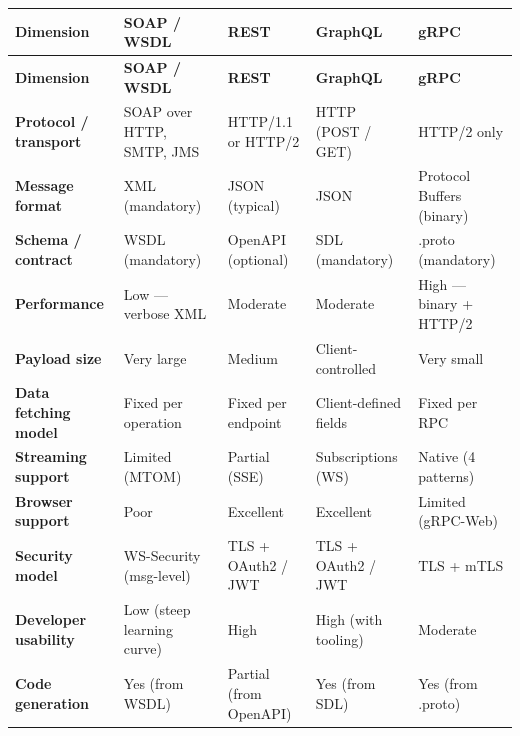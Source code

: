 \documentclass[11pt,a4paper]{article}
\begin{document}
\renewcommand{\arraystretch}{1.2}
\footnotesize
\begin{longtable}{|p{2.6cm}|p{2.85cm}|p{2.85cm}|p{2.85cm}|p{2.85cm}|}
\hline
\textbf{Dimension}
  & \textbf{SOAP / WSDL}
  & \textbf{REST}
  & \textbf{GraphQL}
  & \textbf{gRPC} \\
\hline
\endfirsthead
\hline
\textbf{Dimension}
  & \textbf{SOAP / WSDL}
  & \textbf{REST}
  & \textbf{GraphQL}
  & \textbf{gRPC} \\
\hline
\endhead
\hline
\endfoot

\textbf{Protocol / transport}
  & SOAP over HTTP, SMTP, JMS
  & HTTP/1.1 or HTTP/2
  & HTTP (POST / GET)
  & HTTP/2 only \\
\hline

\textbf{Message format}
  & XML (mandatory)
  & JSON (typical)
  & JSON
  & Protocol Buffers (binary) \\
\hline

\textbf{Schema / contract}
  & WSDL (mandatory)
  & OpenAPI (optional)
  & SDL (mandatory)
  & .proto (mandatory) \\
\hline

\textbf{Performance}
  & Low --- verbose XML
  & Moderate
  & Moderate
  & High --- binary + HTTP/2 \\
\hline

\textbf{Payload size}
  & Very large
  & Medium
  & Client-controlled
  & Very small \\
\hline

\textbf{Data fetching model}
  & Fixed per operation
  & Fixed per endpoint
  & Client-defined fields
  & Fixed per RPC \\
\hline

\textbf{Streaming support}
  & Limited (MTOM)
  & Partial (SSE)
  & Subscriptions (WS)
  & Native (4 patterns) \\
\hline

\textbf{Browser support}
  & Poor
  & Excellent
  & Excellent
  & Limited (gRPC-Web) \\
\hline

\textbf{Security model}
  & WS-Security (msg-level)
  & TLS + OAuth2 / JWT
  & TLS + OAuth2 / JWT
  & TLS + mTLS \\
\hline

\textbf{Developer usability}
  & Low (steep learning curve)
  & High
  & High (with tooling)
  & Moderate \\
\hline

\textbf{Code generation}
  & Yes (from WSDL)
  & Partial (from OpenAPI)
  & Yes (from SDL)
  & Yes (from .proto) \\
\hline


\end{longtable}
\end{document}
